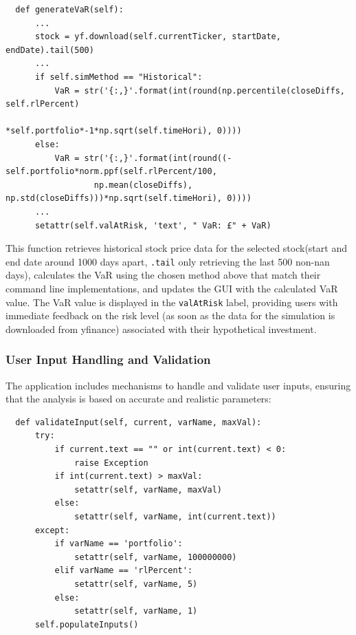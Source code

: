 \documentclass{article}
\begin{document}
\begin{verbatim}
  def generateVaR(self):
      ...
      stock = yf.download(self.currentTicker, startDate, endDate).tail(500)
      ...
      if self.simMethod == "Historical":
          VaR = str('{:,}'.format(int(round(np.percentile(closeDiffs, self.rlPercent)
                                     *self.portfolio*-1*np.sqrt(self.timeHori), 0))))
      else:
          VaR = str('{:,}'.format(int(round((-self.portfolio*norm.ppf(self.rlPercent/100, 
                  np.mean(closeDiffs), np.std(closeDiffs)))*np.sqrt(self.timeHori), 0))))
      ...
      setattr(self.valAtRisk, 'text', " VaR: £" + VaR)
\end{verbatim}

\vspace{0.3cm}
This function retrieves historical stock price data for the selected stock(start and end date around 1000 days apart, \texttt{.tail} only retrieving the last 500 non-nan days), calculates the VaR using the chosen method above that match their command line implementations, and updates the GUI with the calculated VaR value. The VaR value is displayed in the \texttt{valAtRisk} label, providing users with immediate feedback on the risk level (as soon as the data for the simulation is downloaded from yfinance) associated with their hypothetical investment.\\\vspace{0.3cm}

\subsubsection{User Input Handling and Validation}
The application includes mechanisms to handle and validate user inputs, ensuring that the analysis is based on accurate and realistic parameters:

\begin{verbatim}
  def validateInput(self, current, varName, maxVal):
      try:
          if current.text == "" or int(current.text) < 0:
              raise Exception
          if int(current.text) > maxVal:
              setattr(self, varName, maxVal)
          else:            
              setattr(self, varName, int(current.text))
      except:
          if varName == 'portfolio':
              setattr(self, varName, 100000000)
          elif varName == 'rlPercent':
              setattr(self, varName, 5)
          else:
              setattr(self, varName, 1)
      self.populateInputs()
\end{verbatim}
\end{document}
